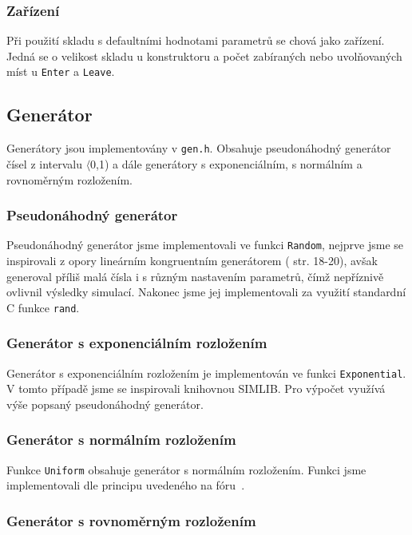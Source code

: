\documentclass[12pt,a4paper,titlepage,final]{article}
\begin{document}
\subsubsection{Zařízení}
Při použití skladu s defaultními hodnotami parametrů se chová jako zařízení. Jedná se o velikost skladu u konstruktoru a počet zabíraných nebo uvolňovaných míst u \texttt{Enter} a \texttt{Leave}.

\subsection{Generátor}

Generátory jsou implementovány v \texttt{gen.h}. Obsahuje pseudonáhodný generátor čísel z intervalu $\langle$0,1) a dále generátory s exponenciálním, s normálním a rovnoměrným rozložením.

\subsubsection{Pseudonáhodný generátor}

Pseudonáhodný generátor jsme implementovali ve funkci \texttt{Random}, nejprve jsme se inspirovali z opory lineárním kongruentním generátorem (\cite{opora} str. 18-20), avšak generoval příliš malá čísla i s různým nastavením parametrů, čímž nepříznivě ovlivnil výsledky simulací. Nakonec jsme jej implementovali za využití standardní C funkce \texttt{rand}.

\subsubsection{Generátor s exponenciálním rozložením}

Generátor s exponenciálním rozložením je implementován ve funkci \texttt{Exponential}. V tomto případě jsme se inspirovali knihovnou SIMLIB. Pro výpočet využívá výše popsaný pseudonáhodný generátor.

\subsubsection{Generátor s normálním rozložením}

Funkce \texttt{Uniform} obsahuje generátor s normálním rozložením. Funkci jsme implementovali dle principu uvedeného na fóru~\cite{forum}.

\subsubsection{Generátor s rovnoměrným rozložením}
\end{document}

